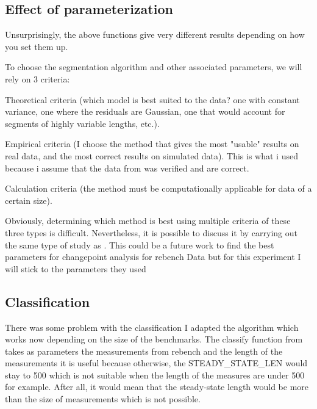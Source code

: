 \documentclass{article}
\begin{document}
\subsection{Effect of parameterization}

Unsurprisingly, the above functions give very different results depending on how you set them up.

To choose the segmentation algorithm and other associated parameters, we will rely on 3 criteria:

Theoretical criteria (which model is best suited to the data? one with constant variance, one where the residuals are Gaussian, one that would account for segments of highly variable lengths, etc.).

Empirical criteria (I choose the method that gives the most "usable" results on real data, and the most correct results on simulated data). This is what i used because i assume that the data from \cite{barrett2017virtual} was verified and are correct.

Calculation criteria (the method must be computationally applicable for data of a certain size).

Obviously, determining which method is best using multiple criteria of these three types is difficult. Nevertheless, it is possible to discuss it by carrying out  the same type of study as \cite{leviandier2012comparison}. This could be a future work to find the best parameters for changepoint analysis for rebench Data but for this experiment I will stick to the parameters they used 

\subsection{Classification}


There was some problem with the classification I adapted the algorithm which works now depending on the size of the benchmarks.
The classify function from \cite{barrett2017virtual} takes as parameters the measurements from rebench and the length of the measurements it is useful because otherwise, the STEADY\_STATE\_LEN would stay to 500 which is not suitable when the length of the measures are under 500 for example. After all, it would mean that the steady-state length would be more than the size of measurements which is not possible.
\end{document}
